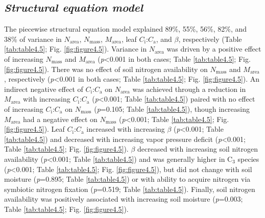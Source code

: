 \subsection{\textit{Structural equation model}}
\noindent The piecewise structural equation model explained 89\%, 55\%, 56\%, 82\%, and 38\% of variance in $N_\mathrm{area}$, $N_\mathrm{mass}$, $M_\mathrm{area}$, leaf $C_\mathrm{i}$:$C_\mathrm{a}$, and $\beta$, respectively (Table \ref{tab:table4.5}; Fig. \ref{fig:figure4.5}). Variance in $N_\mathrm{area}$ was driven by a positive effect of increasing $N_\mathrm{mass}$ and $M_\mathrm{area}$ (\textit{p}<0.001 in both cases; Table \ref{tab:table4.5}; Fig. \ref{fig:figure4.5}). There was no effect of soil nitrogen availability on $N_\mathrm{mass}$ and $M_\mathrm{area}$, respectively (\textit{p}<0.001 in both cases; Table \ref{tab:table4.5}; Fig. \ref{fig:figure4.5}). An indirect negative effect of $C_\mathrm{i}$:$C_\mathrm{a}$ on $N_\mathrm{area}$ was achieved through a reduction in $M_\mathrm{area}$ with increasing $C_\mathrm{i}$:$C_\mathrm{a}$ (\textit{p}<0.001; Table \ref{tab:table4.5}) paired with no effect of increasing $C_\mathrm{i}$:$C_\mathrm{a}$ on $N_\mathrm{mass}$ (\textit{p}=0.105; Table \ref{tab:table4.5}), though increasing $M_\mathrm{area}$ had a negative effect on $N_\mathrm{mass}$ (\textit{p}<0.001; Table \ref{tab:table4.5}; Fig. \ref{fig:figure4.5}). Leaf $C_\mathrm{i}$:$C_\mathrm{a}$ increased with increasing $\beta$ (\textit{p}<0.001; Table \ref{tab:table4.5}) and decreased with increasing vapor pressure deficit (\textit{p}<0.001; Table \ref{tab:table4.5}; Fig. \ref{fig:figure4.5}). $\beta$ decreased with increasing soil nitrogen availability (\textit{p}<0.001; Table \ref{tab:table4.5}) and was generally higher in C$_3$ species (\textit{p}<0.001; Table \ref{tab:table4.5}; Fig. \ref{fig:figure4.5}), but did not change with soil moisture (\textit{p}=0.895; Table \ref{tab:table4.5}) or with ability to acquire nitrogen via symbiotic nitrogen fixation (\textit{p}=0.519; Table \ref{tab:table4.5}). Finally, soil nitrogen availability was positively associated with increasing soil moisture (\textit{p}=0.003; Table \ref{tab:table4.5}; Fig. \ref{fig:figure4.5}).

